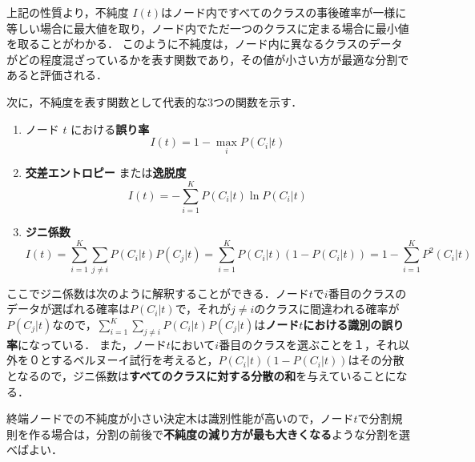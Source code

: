 \documentclass[dvipdfmx]{jreport}
\begin{document}
上記の性質より，不純度 ${I}(t)$はノード内ですべてのクラスの事後確率が一様に等しい場合に最大値を取り，ノード内でただ一つのクラスに定まる場合に最小値を取ることがわかる．
このように不純度は，ノード内に異なるクラスのデータがどの程度混ざっているかを表す関数であり，その値が小さい方が最適な分割であると評価される．

次に，不純度を表す関数として代表的な3つの関数を示す．
\begin{tcolorbox}[title=\textbf{不純度を表す代表的な関数}]
    \begin{enumerate}
        \item ノード $t$ における\textbf{誤り率}
            \begin{equation}
                {I}(t) = 1 - \max_{i} P(C_i | t) \label{eq:7}
            \end{equation}
        \item \textbf{交差エントロピー} または\textbf{逸脱度}
            \begin{equation}
                {I}(t) = - \sum_{i=1}^{K} P(C_i | t) \ln P(C_i | t) \label{eq:8}
            \end{equation}
        \item \textbf{ジニ係数}
            \begin{equation}
                {I}(t) = \sum_{i=1}^{K} \sum_{j \neq i} P(C_i | t) P(C_j | t) = \sum_{i=1}^{K} P(C_i | t) (1 - P(C_i | t)) = 1 - \sum_{i=1}^{K} P^2(C_i | t) \label{eq:9}
            \end{equation}
    \end{enumerate}
\end{tcolorbox}


ここでジニ係数は次のように解釈することができる．ノード$t$で$i$番目のクラスのデータが選ばれる確率は$P(C_i | t)$で，それが$j \neq i$のクラスに間違われる確率が$P(C_j | t)$なので，$\sum_{i=1}^{K} \sum_{j \neq i} P(C_i | t) P(C_j | t)$は\textbf{ノード$t$における識別の誤り率}になっている．
また，ノード$t$において$i$番目のクラスを選ぶことを１，それ以外を０とするベルヌーイ試行を考えると，$P(C_i | t) (1 - P(C_i | t))$はその分散となるので，ジニ係数は\textbf{すべてのクラスに対する分散の和}を与えていることになる．


終端ノードでの不純度が小さい決定木は識別性能が高いので，ノード$t$で分割規則を作る場合は，分割の前後で\textbf{不純度の減り方が最も大きくなる}ような分割を選べばよい．
\end{document}
